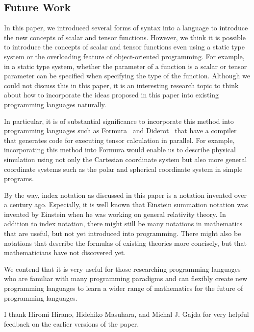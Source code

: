 \documentclass[acmlarge]{acmart}
\begin{document}
\subsection{Future Work}

In this paper, we introduced several forms of syntax into a language to introduce the new concepts of scalar and tensor functions.
However, we think it is possible to introduce the concepts of scalar and tensor functions even using a static type system or the overloading feature of object-oriented programming.
For example, in a static type system, whether the parameter of a function is a scalar or tensor parameter can be specified when specifying the type of the function.
Although we could not discuss this in this paper, it is an interesting research topic to think about how to incorporate the ideas proposed in this paper into existing programming languages naturally.

In particular, it is of substantial significance to incorporate this method into programming languages such as Formura~\cite{muranushi2016automatic} and Diderot~\cite{kindlmann2016diderot} that have a compiler that generates code for executing tensor calculation in parallel.
For example, incorporating this method into Formura would enable us to describe physical simulation using not only the Cartesian coordinate system but also more general coordinate systems such as the polar and spherical coordinate system in simple programs.

By the way, index notation as discussed in this paper is a notation invented over a century ago.
Especially, it is well known that Einstein summation notation was invented by Einstein when he was working on general relativity theory.
In addition to index notation, there might still be many notations in mathematics that are useful, but not yet introduced into programming.
There might also be notations that describe the formulas of existing theories more concisely, but that mathematicians have not discovered yet.

We contend that it is very useful for those researching programming languages who are familiar with many programming paradigms and can flexibly create new programming languages to learn a wider range of mathematics for the future of programming languages.

\begin{acks}
I thank Hiromi Hirano, Hidehiko Masuhara, and Michal J. Gajda for very helpful feedback on the earlier versions of the paper.
\end{acks}



\end{document}

